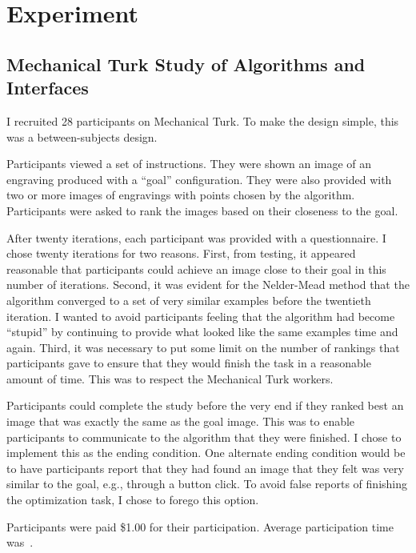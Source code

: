 \section{Experiment}

\subsection{Mechanical Turk Study of Algorithms and Interfaces}

I recruited 28 participants on Mechanical Turk.
To make the design simple, this was a between-subjects design.

Participants viewed a set of instructions.
They were shown an image of an engraving produced with a ``goal'' configuration.
They were also provided with two or more images of engravings with points chosen by the algorithm.
Participants were asked to rank the images based on their closeness to the goal.

After twenty iterations, each participant was provided with a questionnaire.
I chose twenty iterations for two reasons.
First, from testing, it appeared reasonable that participants could achieve an image close to their goal in this number of iterations.
Second, it was evident for the Nelder-Mead method that the algorithm converged to a set of very similar examples before the twentieth iteration.
I wanted to avoid participants feeling that the algorithm had become ``stupid'' by continuing to provide what looked like the same examples time and again.
Third, it was necessary to put some limit on the number of rankings that participants gave to ensure that they would finish the task in a reasonable amount of time.
This was to respect the Mechanical Turk workers.

Participants could complete the study before the very end if they ranked best an image that was exactly the same as the goal image.
This was to enable participants to communicate to the algorithm that they were finished.
I chose to implement this as the ending condition.
One alternate ending condition would be to have participants report that they had found an image that they felt was very similar to the goal, e.g., through a button click.
To avoid false reports of finishing the optimization task, I chose to forego this option.

Participants were paid \$1.00 for their participation.
Average participation time was~.

